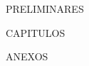 \documentclass[
    11pt,
    oneside,
    openright,
    spanish,
    letterpaper
]{book}
\begin{document}

\restoregeometry

\frontmatter
{}

{{PRELIMINARES}}

\tableofcontents
\listoffigures
\listoftables

\mainmatter
{}

{{CAPITULOS}}

\appendix
{{ANEXOS}}

\backmatter
\printindex
\end{document}
